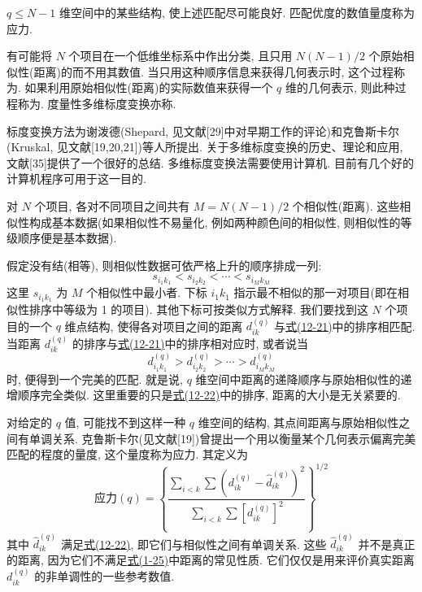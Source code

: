 
$q\le N-1$ 维空间中的某些结构, 使上述匹配尽可能良好. 匹配优度的数值量度称为应力.

有可能将 $N$ 个项目在一个低维坐标系中作出分类, 且只用 $N(N-1)/2$ 个原始相似性(距离)的而不用其数值. 当只用这种顺序信息来获得几何表示时, 这个过程称为. 如果利用原始相似性(距离)的实际数值来获得一个 $q$ 维的几何表示, 则此种过程称为. 度量性多维标度变换亦称.

标度变换方法为谢泼德(Shepard, 见文献[29]中对早期工作的评论)和克鲁斯卡尔(Kruskal, 见文献[19,20,21])等人所提出. 关于多维标度变换的历史、理论和应用, 文献[35]提供了一个很好的总结. 多维标度变换法需要使用计算机. 目前有几个好的计算机程序可用于这一目的.


对 $N$ 个项目, 各对不同项目之间共有 $M=N(N-1)/2$ 个相似性(距离). 这些相似性构成基本数据(如果相似性不易量化, 例如两种颜色间的相似性, 则相似性的等级顺序便是基本数据).

假定没有结(相等), 则相似性数据可依严格上升的顺序排成一列:
\label{eq:12-21}
\begin{equation}
s_{i_1k_1} < s_{i_2k_2} < \cdots < s_{i_Mk_M} \tag{12-21}
\end{equation}
这里 $s_{i_1k_1}$ 为 $M$ 个相似性中最小者. 下标 $i_1k_1$ 指示最不相似的那一对项目(即在相似性排序中等级为 1 的项目). 其他下标可按类似方式解释. 我们要找到这 $N$ 个项目的一个 $q$ 维点结构, 使得各对项目之间的距离 $d_{ik}^{(q)}$ 与\hyperref[eq:12-21]{式(12-21)}中的排序相匹配. 当距离 $d_{ik}^{(q)}$ 的排序与\hyperref[eq:12-21]{式(12-21)}中的排序相对应时, 或者说当
\label{eq:12-22}
\begin{equation}
d_{i_1k_1}^{(q)} > d_{i_2k_2}^{(q)} > \cdots > d_{i_Mk_M}^{(q)} \tag{12-22}
\end{equation}
时, 便得到一个完美的匹配. 就是说, $q$ 维空间中距离的递降顺序与原始相似性的递增顺序完全类似. 这里重要的只是\hyperref[eq:12-22]{式(12-22)}中的排序, 距离的大小是无关紧要的.

对给定的 $q$ 值, 可能找不到这样一种 $q$ 维空间的结构, 其点间距离与原始相似性之间有单调关系. 克鲁斯卡尔(见文献[19])曾提出一个用以衡量某个几何表示偏离完美匹配的程度的量度, 这个量度称为应力. 其定义为
\label{eq:12-23}
\begin{equation}
\text{应力}(q) = \left\{ \frac{\sum\limits_{i<k}\sum (d_{ik}^{(q)} - \hat{d}_{ik}^{(q)})^2}{\sum\limits_{i<k}\sum [d_{ik}^{(q)}]^2} \right\}^{1/2} \tag{12-23}
\end{equation}
其中 $\hat{d}_{ik}^{(q)}$ 满足\hyperref[eq:12-22]{式(12-22)}, 即它们与相似性之间有单调关系. 这些 $\hat{d}_{ik}^{(q)}$ 并不是真正的距离, 因为它们不满足\hyperref[eq:1-25]{式(1-25)}中距离的常见性质. 它们仅仅是用来评价真实距离 $d_{ik}^{(q)}$ 的非单调性的一些参考数值.

